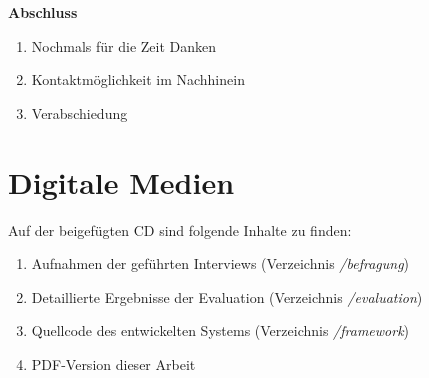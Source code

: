 \textbf{\large Abschluss}

\begin{enumerate}[noitemsep,topsep=0pt]
    \item Nochmals für die Zeit Danken
    \item Kontaktmöglichkeit im Nachhinein
    \item Verabschiedung
\end{enumerate}

\chapter{Digitale Medien}

Auf der beigefügten CD sind folgende Inhalte zu finden:
\begin{enumerate}[noitemsep,topsep=0pt]
    \item Aufnahmen der geführten Interviews (Verzeichnis \textit{/befragung})
    \item Detaillierte Ergebnisse der Evaluation (Verzeichnis \textit{/evaluation})
    \item Quellcode des entwickelten Systems (Verzeichnis \textit{/framework})
    \item PDF-Version dieser Arbeit
\end{enumerate}

